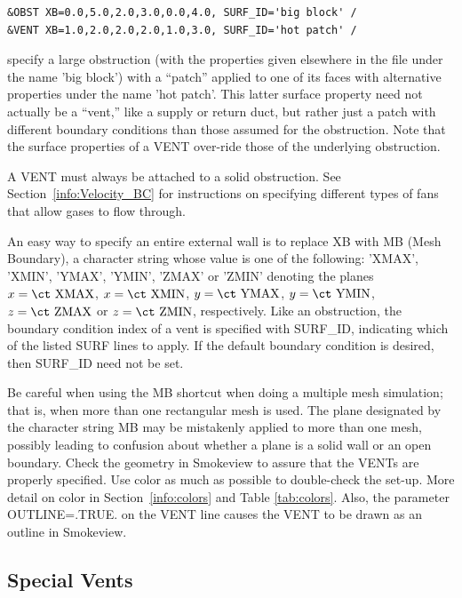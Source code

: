 \documentclass[11pt]{book}
\begin{document}
\begin{lstlisting}
&OBST XB=0.0,5.0,2.0,3.0,0.0,4.0, SURF_ID='big block' /
&VENT XB=1.0,2.0,2.0,2.0,1.0,3.0, SURF_ID='hot patch' /
\end{lstlisting}

\noindent
specify a large obstruction (with the properties given elsewhere in the file under the name {\ct 'big block'}) with
a ``patch'' applied to one of its faces with alternative properties under the name {\ct 'hot patch'}. This latter
surface property need not actually be a ``vent,'' like a supply or return duct, but rather just a patch with different boundary
conditions than those assumed for the obstruction. Note that the surface properties of a {\ct VENT} over-ride those of the
underlying obstruction.

A {\ct VENT} must always be attached to a solid obstruction. See
Section~\ref{info:Velocity_BC} for instructions on specifying different types of fans that allow gases to flow through.

An easy way to specify an entire external wall is to replace {\ct XB} with
{\ct MB} (Mesh Boundary), a character string whose value is one of the following:
{\ct 'XMAX'}, {\ct 'XMIN'}, {\ct 'YMAX'}, {\ct 'YMIN'}, {\ct 'ZMAX'} or
{\ct 'ZMIN'} denoting the planes $x=\hbox{\ct XMAX}$, $x=\hbox{\ct XMIN}$,
$y=\hbox{\ct YMAX}$, $y=\hbox{\ct YMIN}$, $z=\hbox{\ct ZMAX}$
or $z=\hbox{\ct ZMIN}$, respectively.
Like an obstruction, the boundary condition index of a vent is specified
with {\ct SURF\_ID}, indicating which of the listed {\ct SURF} lines to
apply. If the default boundary condition is desired, then {\ct SURF\_ID} need not be set.

Be careful when using the {\ct MB} shortcut when doing a multiple mesh
simulation; that is, when more than one rectangular mesh is used. The
plane designated by the character string {\ct MB} may be mistakenly applied to more than one
mesh, possibly leading to confusion about whether a plane is a solid
wall or an open boundary. Check the geometry in Smokeview to assure that
the {\ct VENT}s are properly specified. Use color as much as
possible to double-check the set-up.  More detail on color in
Section~\ref{info:colors} and Table \ref{tab:colors}. Also, the parameter {\ct OUTLINE=.TRUE.} on the {\ct VENT} line causes the {\ct VENT} to be drawn as an outline in Smokeview.


\subsection{Special Vents}
\end{document}
